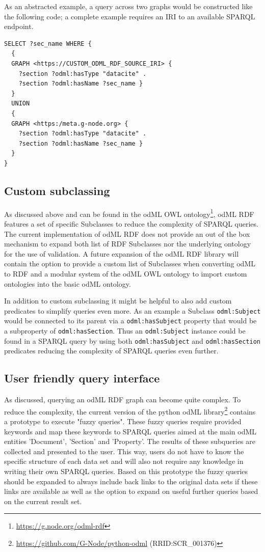 \documentclass{article}
\begin{document}
As an abstracted example, a query across two graphs would be constructed like the following code; a complete example requires an IRI to an available SPARQL endpoint.

\begin{lstlisting}[label=lst:multi_graph, caption=Abstract multiple graph query, basicstyle=\small]
SELECT ?sec_name WHERE {
  {
  GRAPH <https://CUSTOM_ODML_RDF_SOURCE_IRI> {
    ?section ?odml:hasType "datacite" .
    ?section ?odml:hasName ?sec_name }
  }
  UNION
  {
  GRAPH <https:/meta.g-node.org> {
    ?section ?odml:hasType "datacite" .
    ?section ?odml:hasName ?sec_name }
  }
}
\end{lstlisting}

\subsection{Custom subclassing}\label{sec:outlook_subclassing}
As discussed above and can be found in the odML OWL ontology\footnote{\url{https://g.node.org/odml-rdf}}, odML RDF features a set of specific Subclasses to reduce the complexity of SPARQL queries. The current implementation of odML RDF does not provide an out of the box mechanism to expand both list of RDF Subclasses nor the underlying ontology for the use of validation. A future expansion of the odML RDF library will contain the option to provide a custom list of Subclasses when converting odML to RDF and a modular system of the odML OWL ontology to import custom ontologies into the basic odML ontology.

In addition to custom subclassing it might be helpful to also add custom predicates to simplify queries even more. As an example a Subclass \texttt{odml:Subject} would be connected to its parent via a \texttt{odml:hasSubject} property that would be a subproperty of \texttt{odml:hasSection}. Thus an \texttt{odml:Subject} instance could be found in a SPARQL query by using both \texttt{odml:hasSubject} and \texttt{odml:hasSection} predicates reducing the complexity of SPARQL queries even further.

\subsection{User friendly query interface}\label{sec:outlook_fuzzy_queries}
As discussed, querying an odML RDF graph can become quite complex. To reduce the complexity, the current version of the python odML library\footnote{\url{https://github.com/G-Node/python-odml} (RRID:SCR\_001376)} contains a prototype to execute "fuzzy queries". These fuzzy queries require provided keywords and map these keywords to SPARQL queries aimed at the main odML entities 'Document', 'Section' and 'Property'. The results of these subqueries are collected and presented to the user. This way, users do not have to know the specific structure of each data set and will also not require any knowledge in writing their own SPARQL queries. Based on this prototype the fuzzy queries should be expanded to always include back links to the original data sets if these links are available as well as the option to expand on useful further queries based on the current result set.
\end{document}
